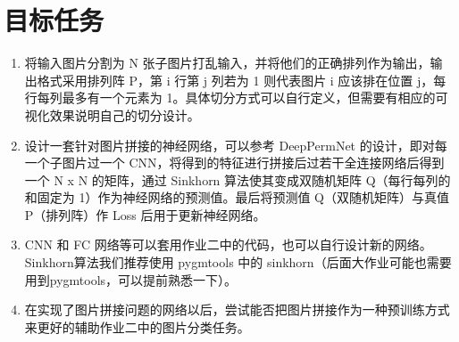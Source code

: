 \documentclass[a4paper]{article}
\begin{document}
\section{目标任务}
\begin{enumerate}
    \item 将输入图片分割为 N 张子图片打乱输入，并将他们的正确排列作为输出，输出格式采用排列阵 P，第 i 行第 j 列若为 1 则代表图片 i 应该排在位置 j，每行每列最多有一个元素为 1。具体切分方式可以自行定义，但需要有相应的可视化效果说明自己的切分设计。
    \item 设计一套针对图片拼接的神经网络，可以参考 DeepPermNet 的设计，即对每一个子图片过一个 CNN，将得到的特征进行拼接后过若干全连接网络后得到一个 N x N 的矩阵，通过 Sinkhorn 算法使其变成双随机矩阵 Q（每行每列的和固定为 1）作为神经网络的预测值。最后将预测值 Q（双随机矩阵）与真值 P（排列阵）作 Loss 后用于更新神经网络。
    \item CNN 和 FC 网络等可以套用作业二中的代码，也可以自行设计新的网络。Sinkhorn算法我们推荐使用 pygmtools 中的 sinkhorn（后面大作业可能也需要用到pygmtools，可以提前熟悉一下）。
    \item 在实现了图片拼接问题的网络以后，尝试能否把图片拼接作为一种预训练方式来更好的辅助作业二中的图片分类任务。
\end{enumerate}
\end{document}
